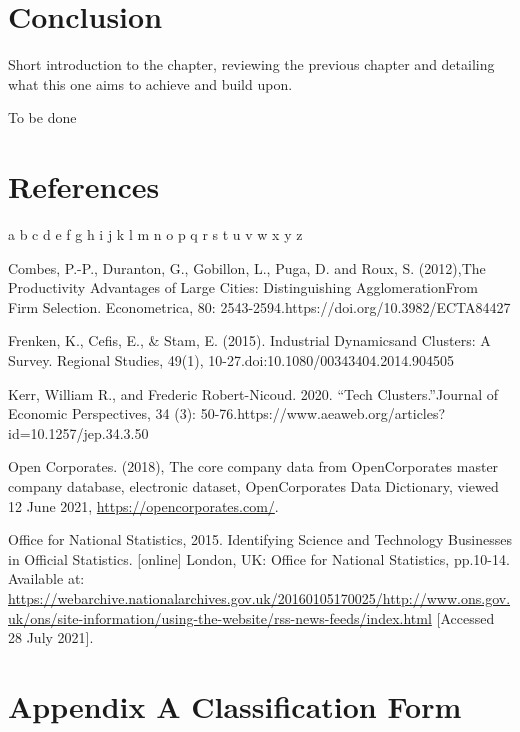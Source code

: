 \documentclass[
  12pt,
  oneside]{book}
\begin{document}
\hypertarget{conclusion}{%
\chapter{Conclusion}\label{conclusion}}

Short introduction to the chapter, reviewing the previous chapter and detailing what this one aims to achieve and build upon.

To be done

\hypertarget{references}{%
\chapter*{References}\label{references}}

a b c d e f g h i j k l m n o p q r s t u v w x y z

Combes, P.-P., Duranton, G., Gobillon, L., Puga, D. and Roux, S. (2012),The Productivity Advantages of Large Cities: Distinguishing AgglomerationFrom Firm Selection. Econometrica, 80: 2543-2594.https://doi.org/10.3982/ECTA84427

Frenken, K., Cefis, E., \& Stam, E. (2015). Industrial Dynamicsand Clusters: A Survey. Regional Studies, 49(1), 10-27.doi:10.1080/00343404.2014.904505

Kerr, William R., and Frederic Robert-Nicoud. 2020. ``Tech Clusters.''Journal of Economic Perspectives, 34 (3): 50-76.https://www.aeaweb.org/articles?id=10.1257/jep.34.3.50

Open Corporates. (2018), The core company data from OpenCorporates master company database, electronic dataset, OpenCorporates Data Dictionary, viewed 12 June 2021, \url{https://opencorporates.com/}.

Office for National Statistics, 2015. Identifying Science and Technology Businesses in Official Statistics. {[}online{]} London, UK: Office for National Statistics, pp.10-14. Available at: \url{https://webarchive.nationalarchives.gov.uk/20160105170025/http://www.ons.gov.uk/ons/site-information/using-the-website/rss-news-feeds/index.html} {[}Accessed 28 July 2021{]}.

\printbibliography

\hypertarget{appendix-a-classification-form}{%
\chapter*{Appendix A Classification Form}\label{appendix-a-classification-form}}
\end{document}
